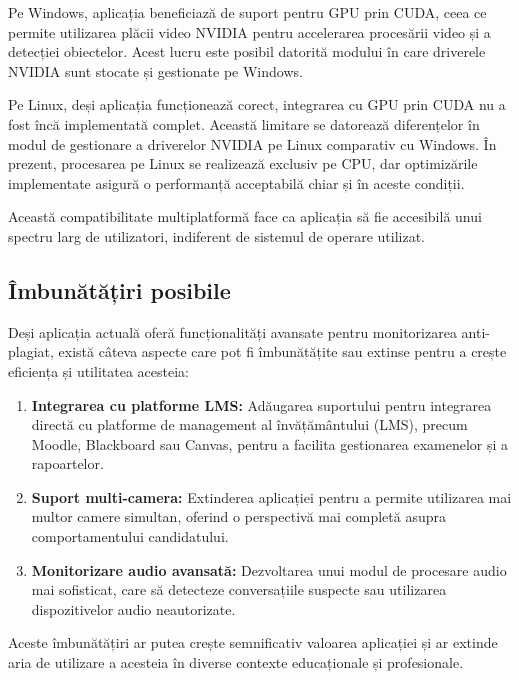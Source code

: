 \documentclass[12pt,a4paper]{article}
\begin{document}
Pe Windows, aplicația beneficiază de suport pentru GPU prin CUDA, ceea ce permite utilizarea plăcii video NVIDIA pentru accelerarea procesării video și a detecției obiectelor. Acest lucru este posibil datorită modului în care driverele NVIDIA sunt stocate și gestionate pe Windows.

Pe Linux, deși aplicația funcționează corect, integrarea cu GPU prin CUDA nu a fost încă implementată complet. Această limitare se datorează diferențelor în modul de gestionare a driverelor NVIDIA pe Linux comparativ cu Windows. În prezent, procesarea pe Linux se realizează exclusiv pe CPU, dar optimizările implementate asigură o performanță acceptabilă chiar și în aceste condiții.

Această compatibilitate multiplatformă face ca aplicația să fie accesibilă unui spectru larg de utilizatori, indiferent de sistemul de operare utilizat.

\subsection{Îmbunătățiri posibile}

Deși aplicația actuală oferă funcționalități avansate pentru monitorizarea anti-plagiat, există câteva aspecte care pot fi îmbunătățite sau extinse pentru a crește eficiența și utilitatea acesteia:

\begin{enumerate}
    \item \textbf{Integrarea cu platforme LMS:} Adăugarea suportului pentru integrarea directă cu platforme de management al învățământului (LMS), precum Moodle, Blackboard sau Canvas, pentru a facilita gestionarea examenelor și a rapoartelor.

    \item \textbf{Suport multi-camera:} Extinderea aplicației pentru a permite utilizarea mai multor camere simultan, oferind o perspectivă mai completă asupra comportamentului candidatului.

    \item \textbf{Monitorizare audio avansată:} Dezvoltarea unui modul de procesare audio mai sofisticat, care să detecteze conversațiile suspecte sau utilizarea dispozitivelor audio neautorizate.

\end{enumerate}

Aceste îmbunătățiri ar putea crește semnificativ valoarea aplicației și ar extinde aria de utilizare a acesteia în diverse contexte educaționale și profesionale.
\end{document}
